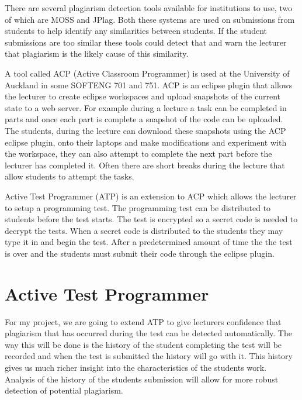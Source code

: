 \documentclass[twocolumn]{article}
\begin{document}
There are several plagiarism detection tools available for institutions to use,
two of which are MOSS\cite{schleimer2003winnowing} and
JPlag\cite{lutz2000jplag}. Both these systems are used on submissions from
students to help identify any similarities between students. If the student
submissions are too similar these tools could detect that and warn the lecturer
that plagiarism is the likely cause of this similarity.

A tool called ACP (Active Classroom Programmer)\cite{giacaman2015active} is used
at the University of Auckland in some SOFTENG 701 and 751. ACP is an eclipse
plugin that allows the lecturer to create eclipse workspaces and upload
snapshots of the current state to a web server. For example during a lecture a
task can be completed in parts and once each part is complete a snapshot of the
code can be uploaded. The students, during the lecture can download these
snapshots using the ACP eclipse plugin, onto their laptops and make
modifications and experiment with the workspace, they can also attempt to
complete the next part before the lecturer has completed it. Often there are
short breaks during the lecture that allow students to attempt the tasks.

Active Test Programmer (ATP) is an extension to ACP which allows the lecturer to
setup a programming test. The programming test can be distributed to students
before the test starts. The test is encrypted so a secret code is needed to
decrypt the tests. When a secret code is distributed to the students they may
type it in and begin the test. After a predetermined amount of time the the test
is over and the students must submit their code through the eclipse plugin.

\section{Active Test Programmer}
For my project, we are going to extend ATP to give lecturers confidence that
plagiarism that has occurred during the test can be detected automatically. The
way this will be done is the history of the student completing the test will be
recorded and when the test is submitted the history will go with it. This
history gives us much richer insight into the characteristics of the students
work. Analysis of the history of the students submission will allow for more
robust detection of potential plagiarism.
\end{document}
